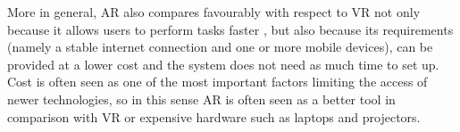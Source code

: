 More in general, AR also compares favourably with respect to \gls{VR} not only because it allows users to perform tasks faster \citep{7833028}, but also because its requirements (namely a stable internet connection and one or more mobile devices), can be provided at a lower cost and the system does not need as much time to set up. Cost is often seen as one of the most important factors limiting the access of newer technologies, so in this sense AR is often seen as a better tool in comparison with VR or expensive hardware such as laptops and projectors.